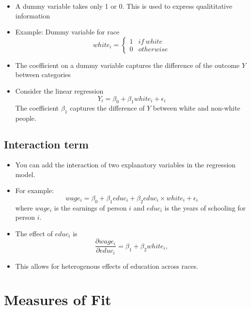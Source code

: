 \documentclass[]{book}
\providecommand{\tightlist}{%
  \setlength{\itemsep}{0pt}\setlength{\parskip}{0pt}}
\begin{document}
\begin{itemize}
\tightlist
\item
  A dummy variable takes only 1 or 0. This is used to express qualititative information
\item
  Example: Dummy variable for race
  \[
  white_{i}=\begin{cases}
  1 & if\ white\\
  0 & otherwise
  \end{cases} 
   \]
\item
  The coefficient on a dummy variable captures the difference of the outcome \(Y\) between categories
\item
  Consider the linear regression
  \[
    Y_i = \beta_0 + \beta_1 white_i + \epsilon_i
    \]
  The coefficient \(\beta_1\) captures the difference of \(Y\) between white and non-white people.
\end{itemize}

\hypertarget{interaction-term}{%
\subsection{Interaction term}\label{interaction-term}}

\begin{itemize}
\tightlist
\item
  You can add the interaction of two explanatory variables in the regression model.
\item
  For example:
  \[
    wage_i = \beta_0 + \beta_1 educ_i + \beta_2 educ_i \times white_i + \epsilon_i
    \]
  where \(wage_i\) is the earnings of person \(i\) and \(educ_i\) is the years of schooling for person \(i\).
\item
  The effect of \(educ_i\) is
  \[
    \frac{\partial wage_i}{\partial educ_i} = \beta_1 + \beta_2 white_i,
  \]
\item
  This allows for heterogenous effects of education across races.
\end{itemize}

\hypertarget{measures-of-fit}{%
\section{Measures of Fit}\label{measures-of-fit}}
\end{document}
